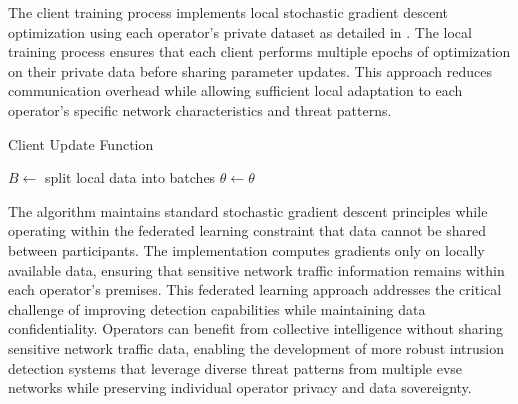 The client training process implements local stochastic gradient descent optimization using each operator's private dataset as detailed in . The local training process ensures that each client performs multiple epochs of optimization on their private data before sharing parameter updates. This approach reduces communication overhead while allowing sufficient local adaptation to each operator's specific network characteristics and threat patterns. \\

\begin{algorithm}[H]
	\caption{Client Update Function\vspace{0.25em}}
	\label{algorithm:client-update}
	\vspace*{3.5pt}
	{
		$B \leftarrow$ split local data into batches\;
		$\theta \leftarrow \theta$ 
		\Return{$\theta$}\;
	}
\end{algorithm}

The algorithm maintains standard stochastic gradient descent principles while operating within the federated learning constraint that data cannot be shared between participants. The implementation computes gradients only on locally available data, ensuring that sensitive network traffic information remains within each operator's premises.
This federated learning approach addresses the critical challenge of improving detection capabilities while maintaining data confidentiality. Operators can benefit from collective intelligence without sharing sensitive network traffic data, enabling the development of more robust intrusion detection systems that leverage diverse threat patterns from multiple \gls{evse} networks while preserving individual operator privacy and data sovereignty. \\

